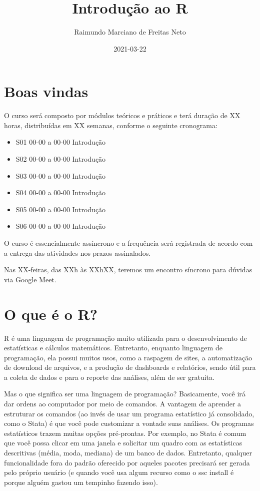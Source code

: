 \documentclass[
]{book}
\title{Introdução ao R}
\author{Raimundo Marciano de Freitas Neto}
\date{2021-03-22}
\providecommand{\tightlist}{%
  \setlength{\itemsep}{0pt}\setlength{\parskip}{0pt}}
\begin{document}
\maketitle

{
\setcounter{tocdepth}{1}
\tableofcontents
}
\hypertarget{boas-vindas}{%
\chapter{Boas vindas}\label{boas-vindas}}

O curso será composto por módulos teóricos e práticos e terá duração de XX horas, distribuídas em XX semanas, conforme o seguinte cronograma:

\begin{itemize}
\tightlist
\item
  S01 00-00 a 00-00 Introdução
\item
  S02 00-00 a 00-00 Introdução
\item
  S03 00-00 a 00-00 Introdução
\item
  S04 00-00 a 00-00 Introdução
\item
  S05 00-00 a 00-00 Introdução
\item
  S06 00-00 a 00-00 Introdução
\end{itemize}

O curso é essencialmente assíncrono e a frequência será registrada de acordo com a entrega das atividades nos prazos assinalados.

Nas XX-feiras, das XXh às XXhXX, teremos um encontro síncrono para dúvidas via Google Meet.

\hypertarget{intro}{%
\chapter{O que é o R?}\label{intro}}

R é uma linguagem de programação muito utilizada para o desenvolvimento de estatísticas e cálculos matemáticos. Entretanto, enquanto linguagem de programação, ela possui muitos usos, como a raspagem de sites, a automatização de download de arquivos, e a produção de dashboards e relatórios, sendo útil para a coleta de dados e para o reporte das análises, além de ser gratuita.

Mas o que significa ser uma linguagem de programação? Basicamente, você irá dar ordens ao computador por meio de comandos. A vantagem de aprender a estruturar os comandos (ao invés de usar um programa estatístico já consolidado, como o Stata) é que você pode customizar a vontade suas análises. Os programas estatísticos trazem muitas opções pré-prontas. Por exemplo, no Stata é comum que você possa clicar em uma janela e solicitar um quadro com as estatísticas descritivas (média, moda, mediana) de um banco de dados. Entretanto, qualquer funcionalidade fora do padrão oferecido por aqueles pacotes precisará ser gerada pelo próprio usuário (e quando você usa algum recurso como o ssc install é porque alguém gastou um tempinho fazendo isso).
\end{document}
